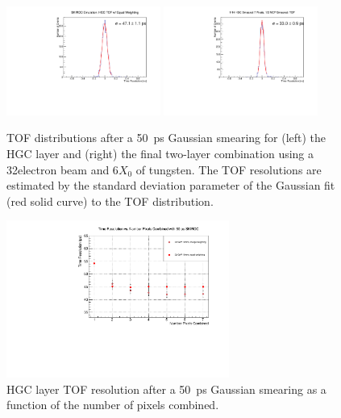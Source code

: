 \begin{figure}[h] 
\centering
\includegraphics[width=0.45\textwidth]{HGC/deltaTPicoSilEqualSmear50.pdf} 
\includegraphics[width=0.45\textwidth]{HGC/deltaT_PicoSilEqual_MCP_Equal_BothSmear50.pdf} 
\caption{TOF distributions after a 50~ps Gaussian smearing for (left)
  the HGC layer and (right) the final two-layer combination using a
  32\GeV electron beam and 6$X_{0}$ of tungsten. The TOF resolutions are estimated by the
standard deviation parameter of the Gaussian fit (red solid curve) to the TOF distribution.} 
\label{hgc:tof2_smear} 
\end{figure}
\begin{figure}[h] 
\centering
\includegraphics[width=0.65\textwidth]{HGC/smearing_50_10mm.pdf} 
\caption{HGC layer TOF resolution after a 50~ps Gaussian smearing as a function of the number of
  pixels combined.} 
\label{hgc:tof_vs_pixel_smear} 
\end{figure}

